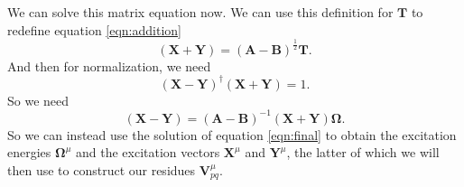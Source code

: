 \documentclass[12pt]{caltech_thesis}
\begin{document}
We can solve this matrix equation now. We can use this definition for $\textbf{T}$ to redefine equation \ref{eqn:addition} 
\begin{equation}
    (\textbf{X}+\textbf{Y}) = (\textbf{A}-\textbf{B})^{\frac{1}{2}}\textbf{T}.
\end{equation}
And then for normalization, we need
\begin{equation}
    (\textbf{X}-\textbf{Y})^{\dag}(\textbf{X}+\textbf{Y})=1.
\end{equation}
So we need
\begin{equation}
    (\textbf{X}-\textbf{Y})=(\textbf{A}-\textbf{B})^{-1}(\textbf{X}+\textbf{Y})\boldsymbol{\Omega } .
\end{equation}
So we can instead use the solution of equation \ref{eqn:final} to obtain the excitation energies $\boldsymbol{\Omega }^{\mu}$ and the excitation vectors $\textbf{X}^{\mu}$ and $\textbf{Y}^{\mu}$, the latter of which we will then use to construct our residues $\textbf{V}^{\mu}_{pq}$.
\end{document}
